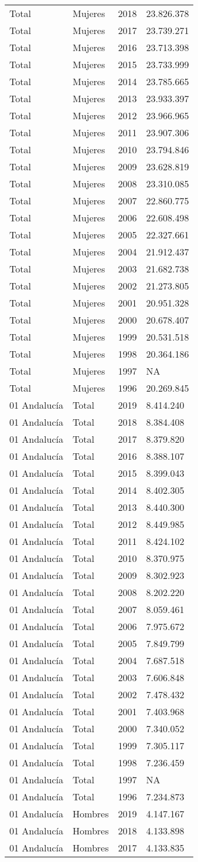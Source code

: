 \documentclass[
]{article}
\begin{document}
\begin{longtable}[]{@{}llrl@{}}
Total & Mujeres & 2018 & 23.826.378\tabularnewline
Total & Mujeres & 2017 & 23.739.271\tabularnewline
Total & Mujeres & 2016 & 23.713.398\tabularnewline
Total & Mujeres & 2015 & 23.733.999\tabularnewline
Total & Mujeres & 2014 & 23.785.665\tabularnewline
Total & Mujeres & 2013 & 23.933.397\tabularnewline
Total & Mujeres & 2012 & 23.966.965\tabularnewline
Total & Mujeres & 2011 & 23.907.306\tabularnewline
Total & Mujeres & 2010 & 23.794.846\tabularnewline
Total & Mujeres & 2009 & 23.628.819\tabularnewline
Total & Mujeres & 2008 & 23.310.085\tabularnewline
Total & Mujeres & 2007 & 22.860.775\tabularnewline
Total & Mujeres & 2006 & 22.608.498\tabularnewline
Total & Mujeres & 2005 & 22.327.661\tabularnewline
Total & Mujeres & 2004 & 21.912.437\tabularnewline
Total & Mujeres & 2003 & 21.682.738\tabularnewline
Total & Mujeres & 2002 & 21.273.805\tabularnewline
Total & Mujeres & 2001 & 20.951.328\tabularnewline
Total & Mujeres & 2000 & 20.678.407\tabularnewline
Total & Mujeres & 1999 & 20.531.518\tabularnewline
Total & Mujeres & 1998 & 20.364.186\tabularnewline
Total & Mujeres & 1997 & NA\tabularnewline
Total & Mujeres & 1996 & 20.269.845\tabularnewline
01 Andalucía & Total & 2019 & 8.414.240\tabularnewline
01 Andalucía & Total & 2018 & 8.384.408\tabularnewline
01 Andalucía & Total & 2017 & 8.379.820\tabularnewline
01 Andalucía & Total & 2016 & 8.388.107\tabularnewline
01 Andalucía & Total & 2015 & 8.399.043\tabularnewline
01 Andalucía & Total & 2014 & 8.402.305\tabularnewline
01 Andalucía & Total & 2013 & 8.440.300\tabularnewline
01 Andalucía & Total & 2012 & 8.449.985\tabularnewline
01 Andalucía & Total & 2011 & 8.424.102\tabularnewline
01 Andalucía & Total & 2010 & 8.370.975\tabularnewline
01 Andalucía & Total & 2009 & 8.302.923\tabularnewline
01 Andalucía & Total & 2008 & 8.202.220\tabularnewline
01 Andalucía & Total & 2007 & 8.059.461\tabularnewline
01 Andalucía & Total & 2006 & 7.975.672\tabularnewline
01 Andalucía & Total & 2005 & 7.849.799\tabularnewline
01 Andalucía & Total & 2004 & 7.687.518\tabularnewline
01 Andalucía & Total & 2003 & 7.606.848\tabularnewline
01 Andalucía & Total & 2002 & 7.478.432\tabularnewline
01 Andalucía & Total & 2001 & 7.403.968\tabularnewline
01 Andalucía & Total & 2000 & 7.340.052\tabularnewline
01 Andalucía & Total & 1999 & 7.305.117\tabularnewline
01 Andalucía & Total & 1998 & 7.236.459\tabularnewline
01 Andalucía & Total & 1997 & NA\tabularnewline
01 Andalucía & Total & 1996 & 7.234.873\tabularnewline
01 Andalucía & Hombres & 2019 & 4.147.167\tabularnewline
01 Andalucía & Hombres & 2018 & 4.133.898\tabularnewline
01 Andalucía & Hombres & 2017 & 4.133.835\tabularnewline

\end{longtable}
\end{document}
